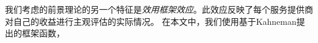 
我们考虑的前景理论的另一个特征是\emph{效用框架效应}。此效应反映了每个服务提供商对自己的收益进行主观评估的实际情况。
在本文中，我们使用基于Kahneman提出的框架函数\cite{Kahneman}，
